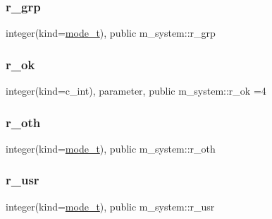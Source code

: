 \subsubsection{\texorpdfstring{r\+\_\+grp}{r\_grp}}
{\footnotesize\ttfamily integer(kind=\mbox{\hyperlink{namespacem__system_abdb5cc27c945379d844db4830d499050}{mode\+\_\+t}}), public m\+\_\+system\+::r\+\_\+grp}

\mbox{\label{namespacem__system_a86ca380e22d30a8795b4d99f1836ece8}} 
\subsubsection{\texorpdfstring{r\+\_\+ok}{r\_ok}}
{\footnotesize\ttfamily integer(kind=c\+\_\+int), parameter, public m\+\_\+system\+::r\+\_\+ok =4}

\mbox{\label{namespacem__system_a144868e3f7e98d339ba59eac96a413b7}} 
\subsubsection{\texorpdfstring{r\+\_\+oth}{r\_oth}}
{\footnotesize\ttfamily integer(kind=\mbox{\hyperlink{namespacem__system_abdb5cc27c945379d844db4830d499050}{mode\+\_\+t}}), public m\+\_\+system\+::r\+\_\+oth}

\mbox{\label{namespacem__system_a26b623dd9e8e115960edbb0f252ccf6b}} 
\subsubsection{\texorpdfstring{r\+\_\+usr}{r\_usr}}
{\footnotesize\ttfamily integer(kind=\mbox{\hyperlink{namespacem__system_abdb5cc27c945379d844db4830d499050}{mode\+\_\+t}}), public m\+\_\+system\+::r\+\_\+usr}

\mbox{\label{namespacem__system_a23010fa4addcb4c58b4cb0334a4fdec0}} 
